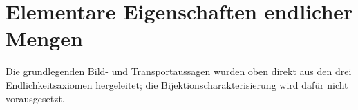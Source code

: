 \documentclass[main.tex]{subfiles}
\begin{document}
\begin{tabproofsplitwide}
  \closeproofpartwide
\end{tabproofsplitwide}

\begin{tabproofsplit}
  \proofpart{\(\vdash\)}
  \closeproofpart

  \proofpart{\(\dashv\)}
  \closeproofpart
\end{tabproofsplit}

\section{Elementare Eigenschaften endlicher Mengen}

Die grundlegenden Bild- und Transportaussagen wurden oben direkt aus den drei
Endlichkeitsaxiomen hergeleitet; die Bijektionscharakterisierung wird dafür
nicht vorausgesetzt.
\end{document}
